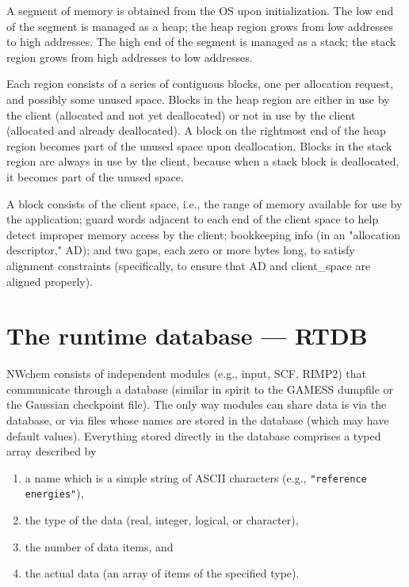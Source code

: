 A segment of memory is obtained from the OS upon initialization.  The
low end of the segment is managed as a heap; the heap region grows
from low addresses to high addresses.  The high end of the segment is
managed as a stack; the stack region grows from high addresses to low
addresses.

Each region consists of a series of contiguous blocks, one per
allocation request, and possibly some unused space.  Blocks in the
heap region are either in use by the client (allocated and not yet
deallocated) or not in use by the client (allocated and already
deallocated).  A block on the rightmost end of the heap region becomes
part of the unused space upon deallocation.  Blocks in the stack
region are always in use by the client, because when a stack block is
deallocated, it becomes part of the unused space.

A block consists of the client space, i.e., the range of memory
available for use by the application; guard words adjacent to each end
of the client space to help detect improper memory access by the
client; bookkeeping info (in an "allocation descriptor," AD); and two
gaps, each zero or more bytes long, to satisfy alignment constraints
(specifically, to ensure that AD and client\_space are aligned
properly).  


\section{The runtime database --- RTDB}

NWchem consists of independent modules (e.g., input, SCF, RIMP2) that
communicate through a database (similar in spirit to the GAMESS
dumpfile or the Gaussian checkpoint file).  The only way modules can
share data is via the database, or via files whose names are stored in
the database (which may have default values).  Everything stored
directly in the database comprises a typed array described by
\begin{enumerate}
\item a name which is a simple string of ASCII characters (e.g., 
      \verb+"reference energies"+),
\item the type of the data (real, integer, logical, or character), 
\item the number of data items, and
\item the actual data (an array of items of the specified type).
\end{enumerate}

